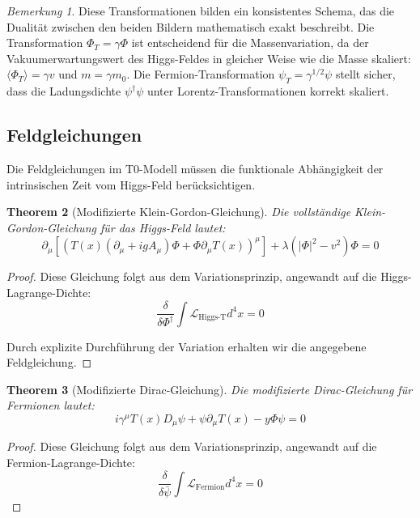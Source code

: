 \documentclass{article}
\newtheorem{theorem}{Theorem}[section]
\theoremstyle{definition}
\theoremstyle{remark}
\newtheorem{remark}[theorem]{Bemerkung}
\newcommand{\Tfield}{T(x)} %
\newcommand{\DcovT}[1]{\Tfield D_\mu #1 + #1 \partial_\mu \Tfield}
\newcommand{\DhiggsTdef}{\Tfield (\partial_\mu + igA_\mu)\Phi + \Phi \partial_\mu \Tfield}
\begin{document}
		\begin{remark}
			Diese Transformationen bilden ein konsistentes Schema, das die Dualität zwischen den beiden Bildern mathematisch exakt beschreibt. Die Transformation $\Phi_T = \gamma \Phi$ ist entscheidend für die Massenvariation, da der Vakuumerwartungswert des Higgs-Feldes in gleicher Weise wie die Masse skaliert: $\langle \Phi_T \rangle = \gamma v$ und $m = \gamma m_0$. Die Fermion-Transformation $\psi_T = \gamma^{1/2} \psi$ stellt sicher, dass die Ladungsdichte $\psi^\dagger\psi$ unter Lorentz-Transformationen korrekt skaliert.
		\end{remark}
		
		\subsection{Feldgleichungen}
		
		Die Feldgleichungen im T0-Modell müssen die funktionale Abhängigkeit der intrinsischen Zeit vom Higgs-Feld berücksichtigen. 
		
		\begin{theorem}[Modifizierte Klein-Gordon-Gleichung]
			Die vollständige Klein-Gordon-Gleichung für das Higgs-Feld lautet:
			\begin{equation}
				\partial_\mu[(\DhiggsTdef)^\mu] + \lambda(|\Phi|^2 - v^2)\Phi = 0
			\end{equation}
		\end{theorem}
		
		\begin{proof}
			Diese Gleichung folgt aus dem Variationsprinzip, angewandt auf die Higgs-Lagrange-Dichte:
			\begin{equation}
				\frac{\delta}{\delta \Phi^\dagger}\int \mathcal{L}_{\text{Higgs-T}} d^4x = 0
			\end{equation}
			
			Durch explizite Durchführung der Variation erhalten wir die angegebene Feldgleichung.
		\end{proof}
		
		\begin{theorem}[Modifizierte Dirac-Gleichung]
			Die modifizierte Dirac-Gleichung für Fermionen lautet:
			\begin{equation}
				i\gamma^\mu \DcovT{\psi} - y\Phi\psi = 0
			\end{equation}
		\end{theorem}
		
		\begin{proof}
			Diese Gleichung folgt aus dem Variationsprinzip, angewandt auf die Fermion-Lagrange-Dichte:
			\begin{equation}
				\frac{\delta}{\delta \bar{\psi}}\int \mathcal{L}_{\text{Fermion}} d^4x = 0
			\end{equation}
		\end{proof}
		
\end{document}
